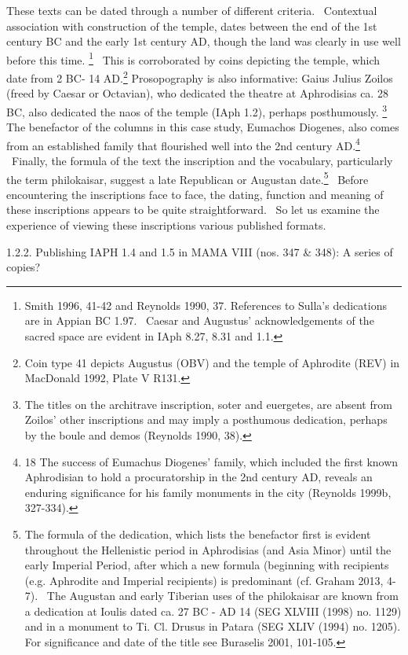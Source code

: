 \documentclass[amsthm,ebook]{saparticle}
\begin{document}
These texts can be dated through a number of different criteria. \ Contextual association with construction of the
temple, dates between the end of the 1st century BC and the early 1st century AD, though the land was clearly in use
well before this time. \footnote{ Smith 1996, 41-42 and Reynolds 1990, 37. References to Sulla’s dedications are in
Appian BC 1.97. \ Caesar and Augustus’ acknowledgements of the sacred space are evident in IAph 8.27, 8.31 and 1.1. }
\ This is corroborated by coins depicting the temple, which date from 2 BC- 14 AD.\footnote{ Coin type 41 depicts
Augustus (OBV) and the temple of Aphrodite (REV) in MacDonald 1992, Plate V R131. } Prosopography is also informative:
Gaius Julius Zoilos (freed by Caesar or Octavian), who dedicated the theatre at Aphrodisias ca. 28 BC, also dedicated
the naos of the temple (IAph 1.2), perhaps posthumously. \footnote{ The titles on the architrave inscription, soter and
euergetes, are absent from Zoilos’ other inscriptions and may imply a posthumous dedication, perhaps by the boule and
demos (Reynolds 1990, 38).} The benefactor of the columns in this case study, Eumachos Diogenes, also comes from an
established family that flourished well into the 2nd century AD.\footnote{18 The success of Eumachus Diogenes’ family,
which included the first known Aphrodisian to hold a procuratorship in the 2nd century AD, reveals an enduring
significance for his family monuments in the city (Reynolds 1999b, 327-334).} \ Finally, the formula of the text the
inscription and the vocabulary, particularly the term philokaisar, suggest a late Republican or Augustan
date.\footnote{ The formula of the dedication, which lists the benefactor first is evident throughout the Hellenistic
period in Aphrodisias (and Asia Minor) until the early Imperial Period, after which a new formula (beginning with
recipients (e.g. Aphrodite and Imperial recipients) is predominant (cf. Graham 2013, 4-7). \ The Augustan and early
Tiberian uses of the philokaisar are known from a dedication at Ioulis dated ca. 27 BC - AD 14 (SEG XLVIII (1998) no.
1129) and in a monument to Ti. Cl. Drusus in Patara (SEG XLIV (1994) no. 1205). For significance and date of the title
see Buraselis 2001, 101-105. } \ Before encountering the inscriptions face to face, the dating, function and meaning of
these inscriptions appears to be quite straightforward. \ So let us examine the experience of viewing these
inscriptions various published formats.


\bigskip

1.2.2. Publishing IAPH 1.4 and 1.5 in MAMA VIII (nos. 347 \& 348): A series of copies?
\end{document}
